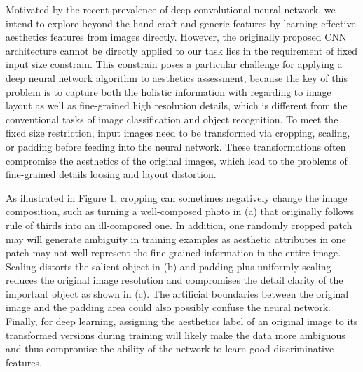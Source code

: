 \documentclass[10pt,twocolumn,letterpaper]{article}
\begin{document}
Motivated by the recent prevalence of deep convolutional neural network,
we intend to explore beyond the hand-craft and generic features 
by learning effective aesthetics features from images directly. 
However, the originally proposed CNN architecture cannot be directly 
applied to our task lies in the requirement of fixed input size constrain. 
This constrain poses a particular challenge for applying a deep neural network 
algorithm to aesthetics assessment, because the key
of this problem is to capture both the holistic information 
with regarding to image layout as well as 
fine-grained high resolution details, which is different from the 
conventional tasks of image classification and object recognition.
To meet the fixed size restriction, input images
need to be transformed via cropping, scaling, or padding
before feeding into the neural network. These transformations
often compromise the aesthetics of the original images, which
lead to the problems of fine-grained details loosing and layout 
distortion. 

As illustrated in Figure 1, cropping can sometimes
negatively change the image composition, such as turning
a well-composed photo in (a) that originally follows rule of
thirds into an ill-composed one. In addition, one randomly cropped 
patch may will generate ambiguity in training examples as aesthetic 
attributes in one patch may not well represent the fine-grained 
information in the entire image. Scaling distorts the salient object 
in (b) and padding plus uniformly scaling reduces the original image 
resolution and compromises the detail clarity of the important object 
as shown in (c). The artificial boundaries between the original image
and the padding area could also possibly confuse the neural network. 
Finally, for deep learning, assigning the aesthetics label 
of an original image to its transformed versions during training 
will likely make the data more ambiguous and thus compromise the 
ability of the network to learn good discriminative features.
\end{document}
